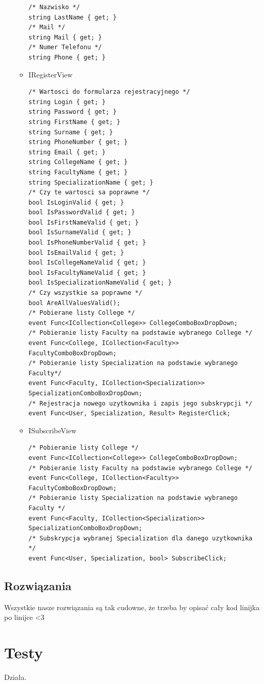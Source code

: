 \documentclass[12pt,a4paper]{article}
\begin{document}
\begin{itemize}
\begin{itemize}
\begin{lstlisting}
/* Nazwisko */
string LastName { get; }
/* Mail */
string Mail { get; }
/* Numer Telefonu */
string Phone { get; }
					\end{lstlisting}
 					\item IRegisterView
					\begin{lstlisting}
/* Wartosci do formularza rejestracyjnego */
string Login { get; }
string Password { get; }
string FirstName { get; }
string Surname { get; }
string PhoneNumber { get; }
string Email { get; }
string CollegeName { get; }
string FacultyName { get; }
string SpecializationName { get; }
/* Czy te wartosci sa poprawne */
bool IsLoginValid { get; }
bool IsPasswordValid { get; }
bool IsFirstNameValid { get; }
bool IsSurnameValid { get; }
bool IsPhoneNumberValid { get; }
bool IsEmailValid { get; }
bool IsCollegeNameValid { get; }
bool IsFacultyNameValid { get; }
bool IsSpecializationNameValid { get; }
/* Czy wszystkie sa poprawne */
bool AreAllValuesValid();
/* Pobierane listy College */
event Func<ICollection<College>> CollegeComboBoxDropDown;
/* Pobieranie listy Faculty na podstawie wybranego College */
event Func<College, ICollection<Faculty>> FacultyComboBoxDropDown;
/* Pobieranie listy Specialization na podstawie wybranego Faculty*/
event Func<Faculty, ICollection<Specialization>> SpecializationComboBoxDropDown;
/* Rejestracja nowego uzytkownika i zapis jego subskrypcji */
event Func<User, Specialization, Result> RegisterClick;

					\end{lstlisting}
					\item ISubscribeView 
					\begin{lstlisting}		
/* Pobieranie listy College */
event Func<ICollection<College>> CollegeComboBoxDropDown;
/* Pobieranie listy Faculty na podstawie wybranego College */
event Func<College, ICollection<Faculty>> FacultyComboBoxDropDown;
/* Pobieranie listy Specialization na podstawie wybranego Faculty */
event Func<Faculty, ICollection<Specialization>> SpecializationComboBoxDropDown;
/* Subskrypcja wybranej Specialization dla danego uzytkownika */
event Func<User, Specialization, bool> SubscribeClick;
			        \end{lstlisting}
				\end{itemize}
			\end{itemize}
\clearpage	\subsection{Rozwiązania}
			Wszystkie nasze rozwiązania są tak cudowne, że trzeba by opisać cały kod linijka po linijce <3
	\section{Testy}
		Działa. 
\end{document}
